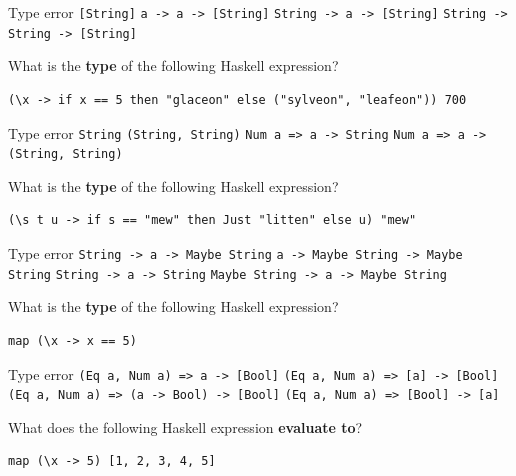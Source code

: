 \documentclass[addpoints]{exam}
\begin{document}
\begin{questions}
\begin{checkboxes}
  \choice Type error
  \choice \texttt{[String]}
  \choice \texttt{a -> a -> [String]}
  \CorrectChoice \texttt{String -> a -> [String]}
  \choice \texttt{String -> String -> [String]}
\end{checkboxes}

\question[4] What is the \textbf{type} of the following Haskell expression?

\begin{verbatim}
(\x -> if x == 5 then "glaceon" else ("sylveon", "leafeon")) 700
\end{verbatim}

\begin{checkboxes}
  \CorrectChoice Type error
  \choice \texttt{String}
  \choice \texttt{(String, String)}
  \choice \texttt{Num a => a -> String}
  \choice \texttt{Num a => a -> (String, String)}
\end{checkboxes}

\question[4] What is the \textbf{type} of the following Haskell expression?

\begin{verbatim}
(\s t u -> if s == "mew" then Just "litten" else u) "mew"
\end{verbatim}

\begin{checkboxes}
  \choice Type error
  \choice \texttt{String -> a -> Maybe String}
  \CorrectChoice \texttt{a -> Maybe String -> Maybe String}
  \choice \texttt{String -> a -> String}
  \choice \texttt{Maybe String -> a -> Maybe String}    
\end{checkboxes}

\question[4] What is the \textbf{type} of the following Haskell expression?

\begin{verbatim}
map (\x -> x == 5)
\end{verbatim}

\begin{checkboxes}
  \choice Type error
  \choice \texttt{(Eq a, Num a) => a -> [Bool]}
  \CorrectChoice \texttt{(Eq a, Num a) => [a] -> [Bool]}
  \choice \texttt{(Eq a, Num a) => (a -> Bool) -> [Bool]}
  \choice \texttt{(Eq a, Num a) => [Bool] -> [a]}
\end{checkboxes}

\newpage

\question[5] What does the following Haskell expression \textbf{evaluate to}?

\begin{verbatim}
map (\x -> 5) [1, 2, 3, 4, 5]
\end{verbatim}


\end{questions}
\end{document}
